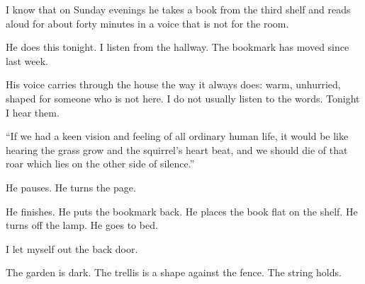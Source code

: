 I know that on Sunday evenings he takes a book from the third shelf and reads aloud for about forty minutes in a voice that is not for the room.

He does this tonight. I listen from the hallway. The bookmark has moved since last week.

His voice carries through the house the way it always does: warm, unhurried, shaped for someone who is not here. I do not usually listen to the words. Tonight I hear them.

``If we had a keen vision and feeling of all ordinary human life, it would be like hearing the grass grow and the squirrel's heart beat, and we should die of that roar which lies on the other side of silence.''

He pauses. He turns the page.

He finishes. He puts the bookmark back. He places the book flat on the shelf. He turns off the lamp. He goes to bed.

I let myself out the back door.

The garden is dark. The trellis is a shape against the fence. The string holds.
